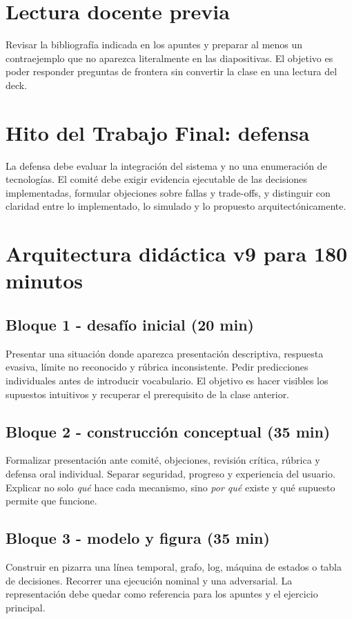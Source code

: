 \documentclass[variant=docente,cover=institutional,mode=screen]{ua-engineering-v6-article}
\begin{document}
\section{Lectura docente previa}
Revisar la bibliografía indicada en los apuntes y preparar al menos un contraejemplo que no aparezca literalmente en las diapositivas. El objetivo es poder responder preguntas de frontera sin convertir la clase en una lectura del deck.

\section{Hito del Trabajo Final: defensa}
La defensa debe evaluar la integración del sistema y no una enumeración de tecnologías. El comité debe exigir evidencia ejecutable de las decisiones implementadas, formular objeciones sobre fallas y trade-offs, y distinguir con claridad entre lo implementado, lo simulado y lo propuesto arquitectónicamente.

\section{Arquitectura didáctica v9 para 180 minutos}
\subsection*{Bloque 1 - desafío inicial (20 min)}
Presentar una situación donde aparezca presentación descriptiva, respuesta evasiva, límite no reconocido y rúbrica inconsistente. Pedir predicciones individuales antes de introducir vocabulario. El objetivo es hacer visibles los supuestos intuitivos y recuperar el prerequisito de la clase anterior.

\subsection*{Bloque 2 - construcción conceptual (35 min)}
Formalizar presentación ante comité, objeciones, revisión crítica, rúbrica y defensa oral individual. Separar seguridad, progreso y experiencia del usuario. Explicar no solo \emph{qué} hace cada mecanismo, sino \emph{por qué} existe y qué supuesto permite que funcione.

\subsection*{Bloque 3 - modelo y figura (35 min)}
Construir en pizarra una línea temporal, grafo, log, máquina de estados o tabla de decisiones. Recorrer una ejecución nominal y una adversarial. La representación debe quedar como referencia para los apuntes y el ejercicio principal.
\end{document}
